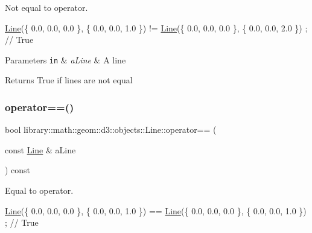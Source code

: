 Not equal to operator. 


\begin{DoxyCode}
\hyperlink{classlibrary_1_1math_1_1geom_1_1d3_1_1objects_1_1_line_a762e529453ff9ffa9233fd73737f4692}{Line}(\{ 0.0, 0.0, 0.0 \}, \{ 0.0, 0.0, 1.0 \}) != \hyperlink{classlibrary_1_1math_1_1geom_1_1d3_1_1objects_1_1_line_a762e529453ff9ffa9233fd73737f4692}{Line}(\{ 0.0, 0.0, 0.0 \}, \{ 0.0, 0.0, 2.0 \}) ; \textcolor{comment}{// True}
\end{DoxyCode}



\begin{DoxyParams}[1]{Parameters}
\mbox{\tt in}  & {\em a\+Line} & A line \\
\hline
\end{DoxyParams}
\begin{DoxyReturn}{Returns}
True if lines are not equal 
\end{DoxyReturn}
\mbox{\label{classlibrary_1_1math_1_1geom_1_1d3_1_1objects_1_1_line_a2e5b0da1d652abbff16d7024f8eecb0a}} 
\subsubsection{\texorpdfstring{operator==()}{operator==()}}
{\footnotesize\ttfamily bool library\+::math\+::geom\+::d3\+::objects\+::\+Line\+::operator== (\begin{DoxyParamCaption}\item[{const \hyperlink{classlibrary_1_1math_1_1geom_1_1d3_1_1objects_1_1_line}{Line} \&}]{a\+Line }\end{DoxyParamCaption}) const}



Equal to operator. 


\begin{DoxyCode}
\hyperlink{classlibrary_1_1math_1_1geom_1_1d3_1_1objects_1_1_line_a762e529453ff9ffa9233fd73737f4692}{Line}(\{ 0.0, 0.0, 0.0 \}, \{ 0.0, 0.0, 1.0 \}) == \hyperlink{classlibrary_1_1math_1_1geom_1_1d3_1_1objects_1_1_line_a762e529453ff9ffa9233fd73737f4692}{Line}(\{ 0.0, 0.0, 0.0 \}, \{ 0.0, 0.0, 1.0 \}) ; \textcolor{comment}{// True}
\end{DoxyCode}



